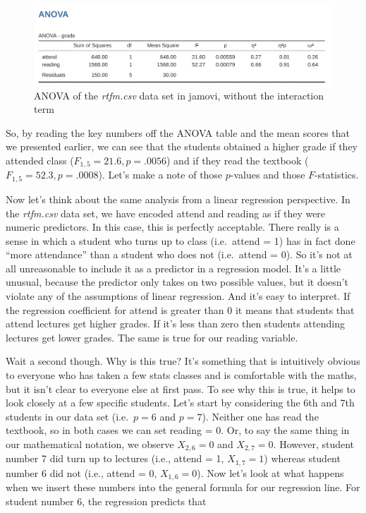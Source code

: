 \documentclass[
  a4paper,
]{book}
\begin{document}
\begin{figure}

\includegraphics[width=1\textwidth,height=\textheight]{images/fig14-17.png} \hfill{}

\caption{\label{fig-fig14-17}ANOVA of the \emph{rtfm.csv} data set in
jamovi, without the interaction term}

\end{figure}

So, by reading the key numbers off the ANOVA table and the mean scores
that we presented earlier, we can see that the students obtained a
higher grade if they attended class (\(F_{1,5} = 21.6, p = .0056\)) and
if they read the textbook (\(F_{1,5} = 52.3, p = .0008\)). Let's make a
note of those \(p\)-values and those \(F\)-statistics.

Now let's think about the same analysis from a linear regression
perspective. In the \emph{rtfm.csv} data set, we have encoded attend and
reading as if they were numeric predictors. In this case, this is
perfectly acceptable. There really is a sense in which a student who
turns up to class (i.e.~attend = 1) has in fact done ``more attendance''
than a student who does not (i.e.~attend = 0). So it's not at all
unreasonable to include it as a predictor in a regression model. It's a
little unusual, because the predictor only takes on two possible values,
but it doesn't violate any of the assumptions of linear regression. And
it's easy to interpret. If the regression coefficient for attend is
greater than 0 it means that students that attend lectures get higher
grades. If it's less than zero then students attending lectures get
lower grades. The same is true for our reading variable.

Wait a second though. Why is this true? It's something that is
intuitively obvious to everyone who has taken a few stats classes and is
comfortable with the maths, but it isn't clear to everyone else at first
pass. To see why this is true, it helps to look closely at a few
specific students. Let's start by considering the 6th and 7th students
in our data set (i.e.~\(p = 6\) and \(p = 7\)). Neither one has read the
textbook, so in both cases we can set reading = 0. Or, to say the same
thing in our mathematical notation, we observe \(X_{2,6} = 0\) and
\(X_{2,7} = 0\). However, student number 7 did turn up to lectures
(i.e., attend = 1, \(X_{1,7} = 1\)) whereas student number 6 did not
(i.e., attend = 0, \(X_{1,6} = 0\)). Now let's look at what happens when
we insert these numbers into the general formula for our regression
line. For student number 6, the regression predicts that
\end{document}
